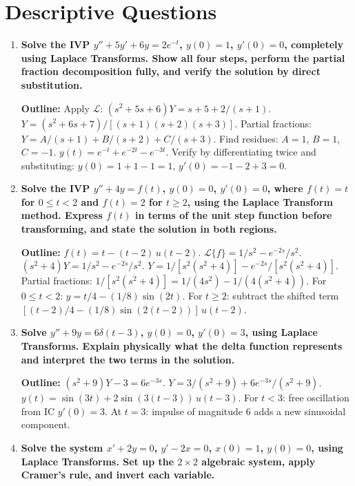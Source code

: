 \documentclass[12pt,a4paper]{article}
\begin{document}
\section{Descriptive Questions}

\begin{enumerate}

\item \textbf{Solve the IVP $y'' + 5y' + 6y = 2e^{-t}$, $y(0)=1$, $y'(0)=0$, completely using
Laplace Transforms. Show all four steps, perform the partial fraction decomposition
fully, and verify the solution by direct substitution.}

\textbf{Outline:} Apply $\mathcal{L}$:
$(s^2+5s+6)Y = s+5 + 2/(s+1)$.
$Y = (s^2+6s+7)/[(s+1)(s+2)(s+3)]$.
Partial fractions: $Y = A/(s+1)+B/(s+2)+C/(s+3)$.
Find residues: $A = 1$, $B = 1$, $C = -1$.
$y(t) = e^{-t} + e^{-2t} - e^{-3t}$.
Verify by differentiating twice and substituting: $y(0)=1+1-1=1$, $y'(0)=-1-2+3=0$.

\item \textbf{Solve the IVP $y'' + 4y = f(t)$, $y(0)=0$, $y'(0)=0$, where
$f(t) = t$ for $0\leq t < 2$ and $f(t)=2$ for $t\geq 2$, using the Laplace Transform
method. Express $f(t)$ in terms of the unit step function before transforming, and
state the solution in both regions.}

\textbf{Outline:} $f(t) = t - (t-2)\,u(t-2)$.
$\mathcal{L}\{f\} = 1/s^2 - e^{-2s}/s^2$.
$(s^2+4)Y = 1/s^2 - e^{-2s}/s^2$.
$Y = 1/[s^2(s^2+4)] - e^{-2s}/[s^2(s^2+4)]$.
Partial fractions: $1/[s^2(s^2+4)] = 1/(4s^2) - 1/(4(s^2+4))$.
For $0\leq t<2$: $y = t/4 - (1/8)\sin(2t)$.
For $t\geq 2$: subtract the shifted term $[(t-2)/4 - (1/8)\sin(2(t-2))]\,u(t-2)$.

\item \textbf{Solve $y'' + 9y = 6\delta(t-3)$, $y(0)=0$, $y'(0)=3$, using Laplace Transforms.
Explain physically what the delta function represents and interpret the two terms in
the solution.}

\textbf{Outline:} $(s^2+9)Y - 3 = 6e^{-3s}$.
$Y = 3/(s^2+9) + 6e^{-3s}/(s^2+9)$.
$y(t) = \sin(3t) + 2\sin(3(t-3))\,u(t-3)$.
For $t<3$: free oscillation from IC $y'(0)=3$.
At $t=3$: impulse of magnitude 6 adds a new sinusoidal component.

\item \textbf{Solve the system $x' + 2y = 0$, $y' - 2x = 0$, $x(0)=1$, $y(0)=0$, using Laplace
Transforms. Set up the $2\times 2$ algebraic system, apply Cramer's rule, and invert
each variable.}


\end{enumerate}
\end{document}
